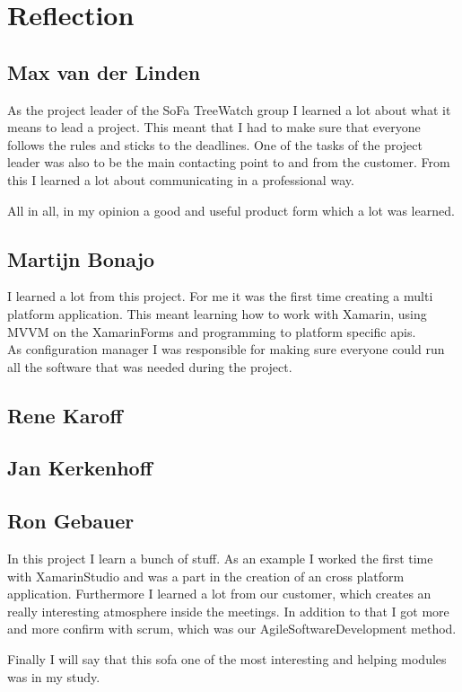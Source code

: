 \section{Reflection}
\subsection{Max van der Linden}
As the project leader of the SoFa TreeWatch group I learned a lot about what it means to lead a project. This meant that I had to make sure that everyone follows the rules and sticks to the deadlines. One of the tasks of the project leader was also to be the main contacting point to and from the customer. From this I learned a lot about communicating in a professional way.

All in all, in my opinion a good and useful product form which a lot was learned.

\subsection{Martijn Bonajo}

I learned a lot from this project. For me it was the first time creating a multi platform application. This meant learning how to work with Xamarin, using MVVM on the \gls{XamarinForms} and programming to platform specific \gls{api}s.\\
As configuration manager I was responsible for making sure everyone could run all the software that was needed during the project.

\subsection{Rene Karoff}


\subsection{Jan Kerkenhoff}


\subsection{Ron Gebauer}
In this project I learn a bunch of stuff. As an example I worked the first time with \gls{XamarinStudio} and was a part in the creation of an cross platform application. Furthermore I learned a lot from our customer, which creates an really interesting atmosphere inside the meetings. In addition to that I got more and more confirm with \gls{scrum}, which was our \gls{AgileSoftwareDevelopment} method.

Finally I will say that this \gls{sofa} one of the most interesting and helping modules was in my study.